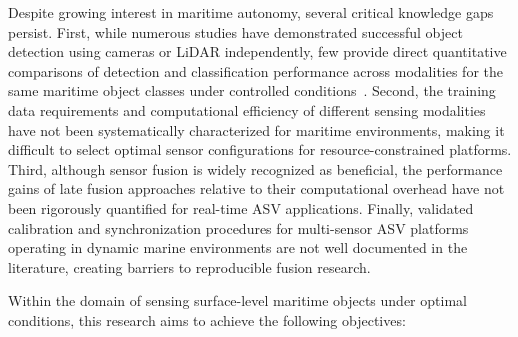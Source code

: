 \documentclass[../main.tex]{subfiles}
\begin{document}
Despite growing interest in maritime autonomy, several critical knowledge gaps persist.
First, while numerous studies have demonstrated successful object detection using cameras or \ac{LiDAR} independently, few provide direct quantitative comparisons of detection and classification performance across modalities for the same maritime object classes under controlled conditions~\cite{Bovcon2020, Prasad2017}.
Second, the training data requirements and computational efficiency of different sensing modalities have not been systematically characterized for maritime environments, making it difficult to select optimal sensor configurations for resource-constrained platforms.
Third, although sensor fusion is widely recognized as beneficial, the performance gains of late fusion approaches relative to their computational overhead have not been rigorously quantified for real-time \ac{ASV} applications.
Finally, validated calibration and synchronization procedures for multi-sensor \ac{ASV} platforms operating in dynamic marine environments are not well documented in the literature, creating barriers to reproducible fusion research.

Within the domain of sensing surface-level maritime objects under optimal conditions, this research aims to achieve the following objectives:
\end{document}
